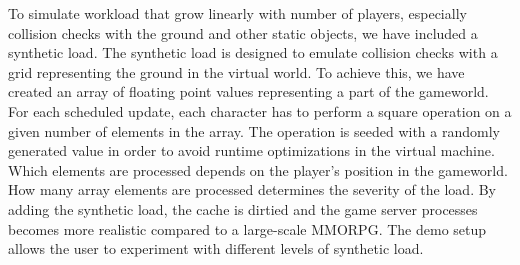To simulate workload that grow linearly with number of players, especially
collision checks with the ground and other static objects, we have included a
synthetic load. The synthetic load is designed to emulate collision checks with
a grid representing the ground in the virtual world. To achieve this, we have
created an array of floating point values representing a part of the gameworld.
For each scheduled update, each character has to perform a square operation on
a given number of elements in the array. The operation is seeded with a
randomly generated value in order to avoid runtime optimizations in the virtual
machine. Which elements are processed depends on the player's position in the
gameworld. How many array elements are processed determines the severity of the
load. By adding the synthetic load, the cache is dirtied and the game server
processes becomes more realistic compared to a large-scale MMORPG. The demo
setup allows the user to experiment with different levels of synthetic load.
